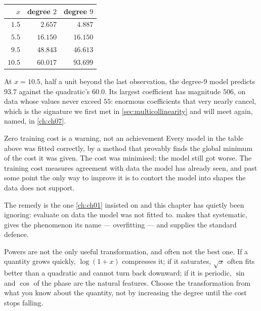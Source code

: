 \begin{center}
\small
\begin{tabular}{@{}rrr@{}}
\toprule
$x$ & degree $2$ & degree $9$\\
\midrule
$1.5$  & $2.657$  & $4.887$\\
$5.5$  & $16.150$ & $16.150$\\
$9.5$  & $48.843$ & $46.613$\\
$10.5$ & $60.017$ & $93.699$\\
\bottomrule
\end{tabular}
\end{center}

At $x = 10.5$, half a unit beyond the last observation, the degree-$9$ model
predicts $93.7$ against the quadratic's $60.0$. Its largest coefficient has
magnitude $506$, on data whose values never exceed $55$: enormous coefficients
that very nearly cancel, which is the signature we first met in
\cref{sec:multicollinearity} and will meet again, named, in \cref{ch:ch07}.

\begin{pitfall}{Zero training cost is a warning, not an achievement}
Every model in the table above was fitted correctly, by a method that provably
finds the global minimum of the cost it was given. The cost was minimised; the
model still got worse. The training cost measures agreement with data the model
has already seen, and past some point the only way to improve it is to
contort the model into shapes the data does not support.

The remedy is the one \cref{ch:ch01} insisted on and this chapter has quietly
been ignoring: evaluate on data the model was not fitted to.  makes
that systematic, gives the phenomenon its name --- overfitting --- and supplies
the standard defence.
\end{pitfall}

Powers are not the only useful transformation, and often not the best one. If a
quantity grows quickly, $\log(1+x)$ compresses it; if it saturates, $\sqrt{x}$
often fits better than a quadratic and cannot turn back downward; if it is
periodic, $\sin$ and $\cos$ of the phase are the natural features. Choose the
transformation from what you know about the quantity, not by increasing the
degree until the cost stops falling.

